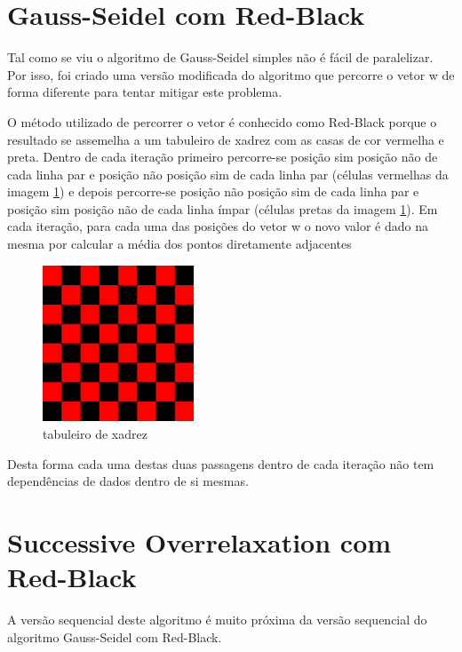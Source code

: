 \documentclass[a4paper]{report}
\begin{document}

\section{Gauss-Seidel com Red-Black}

Tal como se viu o algoritmo de Gauss-Seidel simples não é fácil de
paralelizar. Por isso, foi criado uma versão modificada do algoritmo que
percorre o vetor w de forma diferente para tentar mitigar este problema.

O método utilizado de percorrer o vetor é conhecido como Red-Black porque o
resultado se assemelha a um tabuleiro de xadrez com as casas de cor vermelha e
preta. Dentro de cada iteração primeiro percorre-se posição sim posição não de
cada linha par e posição não posição sim de cada linha par (células vermelhas da
imagem \ref{fig:chess}) e depois percorre-se posição não posição sim de cada
linha par e posição sim posição não de cada linha ímpar (células pretas da
imagem \ref{fig:chess}). Em cada iteração, para cada uma das posições do vetor w
o novo valor é dado na mesma por calcular a média dos pontos diretamente
adjacentes

\begin{figure}[h]
    \centering
        \includegraphics[width=0.4\textwidth]{images/chess.jpg}
        \caption{tabuleiro de xadrez}
        \label{fig:chess}
\end{figure}

Desta forma cada uma destas duas passagens dentro de cada iteração não tem
dependências de dados dentro de si mesmas.


\section{Successive Overrelaxation com Red-Black}

A versão sequencial deste algoritmo é muito próxima da versão sequencial do
algoritmo Gauss-Seidel com Red-Black.
\end{document}
